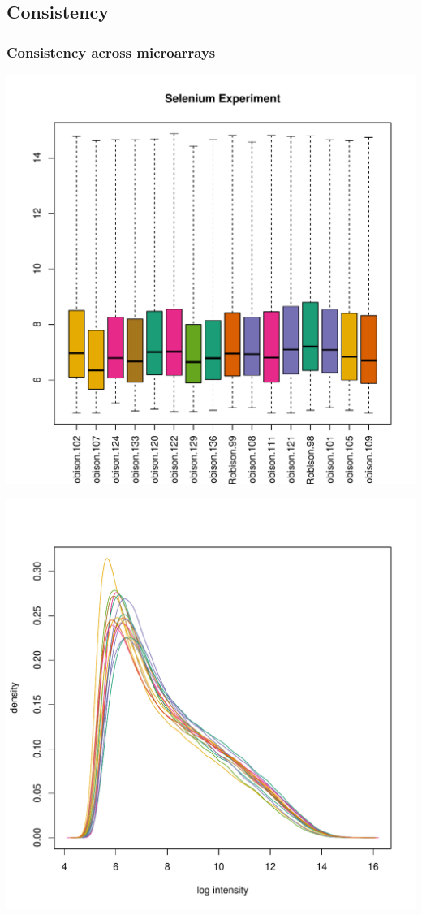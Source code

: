 \documentclass[pdf]{beamer}
\begin{document}
\subsection{Consistency}
\begin{frame}
  \frametitle{Consistency across microarrays}
  \begin{center}
  \centering \includegraphics[scale=0.40]{figures/affybxp.pdf}
  \end{center}
\end{frame}

\begin{frame}
  \begin{center}
  \includegraphics[scale=0.45]{figures/affyhist.pdf}  
  \end{center}
\end{frame}
\end{document}
